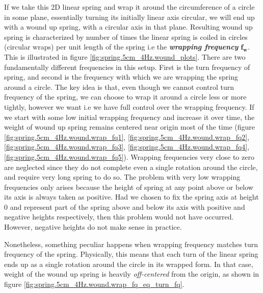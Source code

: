 \documentclass[11pt, a4paper]{article}
\begin{document}
	If we take this 2D linear spring and wrap it around the circumference of a circle in some plane, essentially turning its initially linear axis circular, we will end up with a wound up spring, with a circular axis in that plane. Resulting wound up spring is characterized by number of times the linear spring is coiled in circles (circular wraps) per unit length of the spring i.e the \textbf{\textit{wrapping frequency}} $\boldsymbol{f_{w}}$. This is illustrated in figure \ref{fig:spring.5cm_4Hz.wound_plots}. There are two fundamentally different frequencies in this setup. First is the turn frequency of spring, and second is the frequency with which we are wrapping the spring around a circle. The key idea is that, even though we cannot control turn frequency of the spring, we can choose to wrap it around a circle less or more tightly, however we want i.e we have full control over the wrapping frequency. If we start with some low initial wrapping frequency and increase it over time, the weight of wound up spring remains centered near origin most of the time (figure \ref{fig:spring.5cm_4Hz.wound.wrap_fq1}, \ref{fig:spring.5cm_4Hz.wound.wrap_fq2}, \ref{fig:spring.5cm_4Hz.wound.wrap_fq3}, \ref{fig:spring.5cm_4Hz.wound.wrap_fq4},
	\ref{fig:spring.5cm_4Hz.wound.wrap_fq5}). Wrapping frequencies very close to zero are neglected since they do not complete even a single rotation around the circle, and require very long spring to do so. The problem with very low wrapping frequencies only arises because the height of spring at any point above or below its axis is always taken as positive. Had we chosen to fix the spring axis at height $0$ and represent part of the spring above and below its axis with positive and negative heights respectively, then this problem would not have occurred. However, negative heights do not make sense in practice.
	
	Nonetheless, something peculiar happens when wrapping frequency matches turn frequency of the spring. Physically, this means that each turn of the linear spring ends up as a single rotation around the circle in its wrapped form. In that case, weight of the wound up spring is heavily \textit{off-centered} from the origin, as shown in figure \ref{fig:spring.5cm_4Hz.wound.wrap_fq_eq_turn_fq}. 
	
\end{document}
